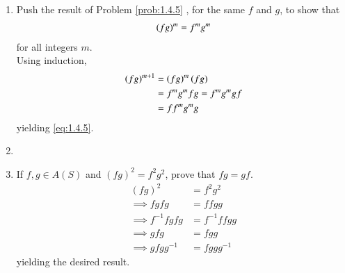 \begin{enumerate}[label=\arabic*.,ref=\thesubsection.\theenumi]
\begin{enumerate}
\end{enumerate}
\item Push the result of Problem 
		\ref{prob:1.4.5}
, for the same $f$ and $g$, to show that 
		\begin{align}
			\label{eq:1.4.5}
			\left(fg\right)^m = f^mg^m 
		\end{align}
for all integers $m$.
\\
		\solution Using induction, 
		\begin{align}
			\left(fg\right)^{m+1} &= 
			\left(fg\right)^{m}(fg) 
			\\
			&= f^mg^m fg = 
f^mg^m gf 
			\\
			&= 
ff^mg^m g 
		\end{align}
		yielding
			\eqref{eq:1.4.5}.
		\item
		\item If $f, g \in A (S)$ and $(fg)^2 = f^2g^2$, prove that $fg = gf$.
			\\
			\solution 
		\begin{align}
			(fg)^2 &= f^2g^2
			\\
			\implies fgfg &= ffgg
			\\
			\implies f^{-1}fgfg &= f^{-1}ffgg
			\\
			\implies gfg &= fgg
			\\
			\implies gf gg^{-1}&= fggg^{-1}
		\end{align}
		yielding the desired result.

\end{enumerate}
